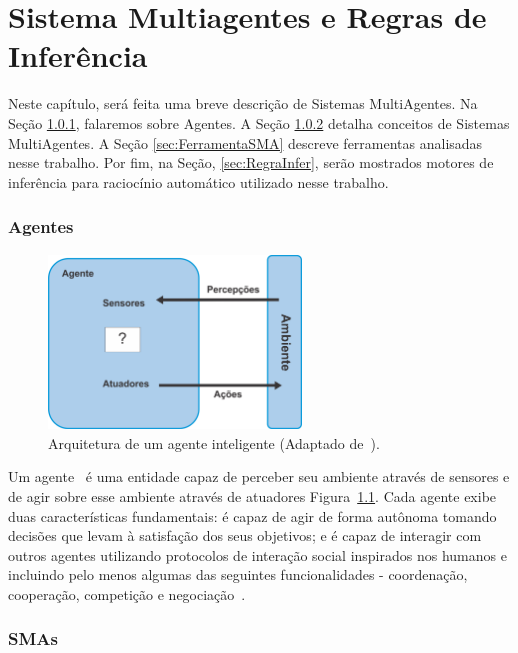 \chapter{Sistema Multiagentes e Regras de Inferência}
\label{sec:SistMult}

Neste capítulo, será feita uma breve descrição de Sistemas MultiAgentes. Na Seção \ref{sec:Agent}, falaremos sobre Agentes. A Seção \ref{sec:SMA} detalha conceitos de Sistemas MultiAgentes. A Seção \ref{sec:FerramentaSMA} descreve ferramentas analisadas nesse trabalho. Por fim, na Seção, \ref{sec:RegraInfer}, serão mostrados motores de inferência para raciocínio automático utilizado nesse trabalho.

\subsection{Agentes} \label{sec:Agent}

\begin{figure}[htb!]
\centering
\includegraphics[angle=0,width=0.6\textwidth]{imagens//Agentes1sem.png}
\caption{Arquitetura de um agente inteligente (Adaptado de~\citep{Russell:2002}).} \label{fig:Agente}
\end{figure}


Um agente~\citep{Russell:2002} é uma entidade capaz de perceber seu ambiente através de sensores e de agir sobre esse ambiente através de atuadores Figura~\ref{fig:Agente}. Cada agente exibe duas características fundamentais: é capaz de agir de forma autônoma tomando decisões que levam à satisfação dos seus objetivos; e é capaz de interagir com outros agentes utilizando protocolos de interação social inspirados nos humanos e incluindo pelo menos algumas das seguintes funcionalidades - coordenação, cooperação, competição e negociação~\citep{Russell:2002}.

\subsection{SMAs} \label{sec:SMA}

